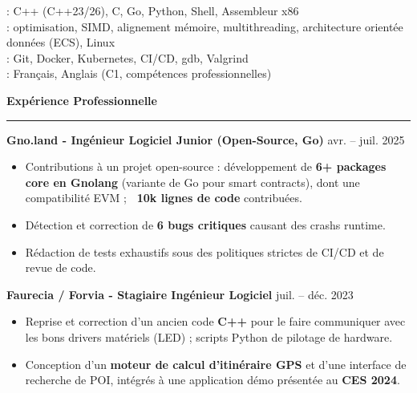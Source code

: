 \documentclass[9pt]{extarticle}
\begin{document}
\hspace*{5pt}{\bfseries Langages}: C++ (C++23/26), C, Go, Python, Shell, Assembleur x86
\\
\hspace*{5pt}{\bfseries Performance}: optimisation, SIMD, alignement mémoire, multithreading, architecture orientée données (ECS), Linux
\\
\hspace*{5pt}{\bfseries Outils}: Git, Docker, Kubernetes, CI/CD, gdb, Valgrind
\\
\hspace*{5pt}{\bfseries Langues}: Français, Anglais (C1, compétences professionnelles)

\par\vspace{5pt}

{\large\bfseries Expérience Professionnelle}
\par\vspace{-8pt}
\rule{\linewidth}{0.4pt}
\par\vspace{5pt}

{\bfseries Gno.land - Ingénieur Logiciel Junior (Open-Source, Go)} \hfill avr. -- juil. 2025
\begin{itemize}[noitemsep, topsep=0pt]
	\item Contributions à un projet open-source : développement de {\bfseries 6+ packages core en Gnolang} (variante de Go pour smart contracts), dont une compatibilité EVM ; {\bfseries ~10k lignes de code} contribuées.
	\item Détection et correction de {\bfseries 6 bugs critiques} causant des crashs runtime.
	\item Rédaction de tests exhaustifs sous des politiques strictes de CI/CD et de revue de code.
\end{itemize}

\par\vspace{5pt}

{\bfseries Faurecia / Forvia - Stagiaire Ingénieur Logiciel} \hfill juil. -- déc. 2023
\begin{itemize}[noitemsep, topsep=0pt]
	\item Reprise et correction d'un ancien code {\bfseries C++} pour le faire communiquer avec les bons drivers matériels (LED) ; scripts Python de pilotage de hardware.
	\item Conception d'un {\bfseries moteur de calcul d'itinéraire GPS} et d'une interface de recherche de POI, intégrés à une application démo présentée au {\bfseries CES 2024}.
\end{itemize}
\end{document}
